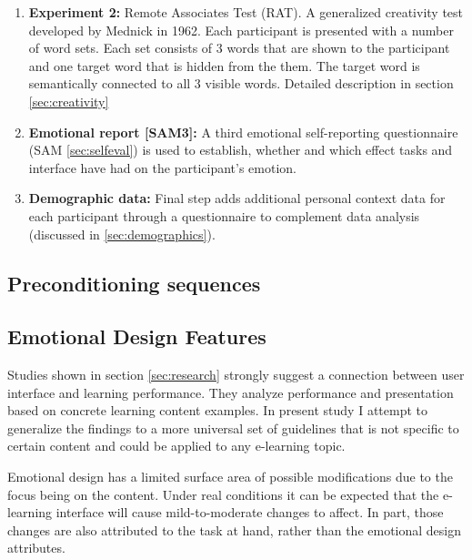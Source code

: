 \begin{enumerate}
		\item \textbf{Experiment 2:} Remote Associates Test (RAT). A generalized creativity test developed by Mednick \cite{Mednick1962} in 1962. Each participant is presented with a number of word sets. Each set consists of 3 words that are shown to the participant and one target word that is hidden from the them. The target word is semantically connected to all 3 visible words. Detailed description in section \ref{sec:creativity}
		
		\item \textbf{Emotional report [SAM3]:} A third emotional self-reporting questionnaire (SAM \ref{sec:selfeval}) is used to establish, whether and which effect tasks and interface have had on the participant's emotion.
		
		\item \textbf{Demographic data:} Final step adds additional personal context data for each participant through a questionnaire to complement data analysis (discussed in \ref{sec:demographics}).
		
	\end{enumerate}
	
	\subsection{Preconditioning sequences} \label{sec:preconditioning}
	
	
	
	\subsection{Emotional Design Features} \label{sec:emotional-design-features}

	Studies shown in section \ref{sec:research} strongly suggest a connection between user interface and learning performance. They analyze performance and presentation based on concrete learning content examples. In present study I attempt to generalize the findings to a more universal set of guidelines that is not specific to certain content and could be applied to any e-learning topic.
	
	Emotional design has a limited surface area of possible modifications due to the focus being on the content. Under real conditions it can be expected that the e-learning interface will cause mild-to-moderate changes to affect. In part, those changes are also attributed to the task at hand, rather than the emotional design attributes.
	
